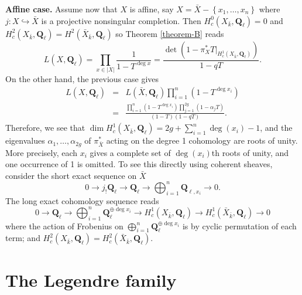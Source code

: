 \documentclass{stacks-project}
\theoremstyle{plain}
\theoremstyle{definition}
\theoremstyle{remark}
\numberwithin{equation}{subsection}
\begin{document}
\medskip\noindent
{\bf Affine case.}
Assume now that $X$ is affine, say $X= \bar X-\left\{x_1, \ldots, x_n\right\}$
where $j : X \hookrightarrow \bar X$ is a projective nonsingular completion.
Then $H_c^0(X_{\bar k}, \mathbf{Q}_\ell) = 0$ and $H_c^2(X_{\bar k},
\mathbf{Q}_\ell) = H^2(\bar X_{\bar k}, \mathbf{Q}_\ell)$ so
Theorem \ref{theorem-B}
reads
$$
L(X, \mathbf{Q}_\ell) = \prod_{x \in |X|}\frac{1}{1 - T^{\deg x}} =
\frac{\det(1-\pi_X^*T |_{H_c^1(X_{\bar k}, \mathbf{Q}_\ell)})}{1 - qT}.
$$
On the other hand, the previous case gives
\begin{eqnarray*}
L(X, \mathbf{Q}_\ell) & = & L(\bar X,
\mathbf{Q}_\ell)\prod_{i = 1}^n\left(1-T^{\deg x_i}\right) \\
& = & \frac{\prod_{i = 1}^n(1-T^{\deg
x_i})\prod_{j = 1}^{2g}(1-\alpha_jT)}{(1-T)(1-qT)}.
\end{eqnarray*}
Therefore, we see that $\dim H_c^1(X_{\bar k}, \mathbf{Q}_\ell) =
2g+\sum_{i = 1}^n \deg(x_i)-1$, and the eigenvalues $\alpha_1, \ldots,
\alpha_{2g}$ of $\pi_{\bar X}^*$ acting on the degree 1 cohomology are roots of
unity. More precisely, each $x_i$ gives a complete set of $\deg(x_i)$th roots
of unity, and one occurrence of 1 is omitted. To see this directly using
coherent sheaves, consider the short exact sequence on $\bar X$
$$
0\to j_!\mathbf{Q}_\ell\to \mathbf{Q}_\ell\to\bigoplus_{i = 1}^n
\mathbf{Q}_{\ell, x_i}\to 0.
$$
The long exact cohomology sequence reads
$$
0\to \mathbf{Q}_\ell \to \bigoplus_{i = 1}^n \mathbf{Q}_\ell^{\oplus \deg x_i}
\to H_c^1(X_{\bar k}, \mathbf{Q}_\ell) \to H_c^1(\bar X_{\bar k},
\mathbf{Q}_\ell)\to 0
$$
where the action of Frobenius on $\bigoplus_{i = 1}^n \mathbf{Q}_\ell^{\oplus
\deg x_i}$ is by cyclic permutation of each term; and $H_c^2(X_{\bar k},
\mathbf{Q}_\ell) = H_c^2(\bar X_{\bar k}, \mathbf{Q}_\ell)$.






\section{The Legendre family}
\label{section-legendre-family}
\end{document}
